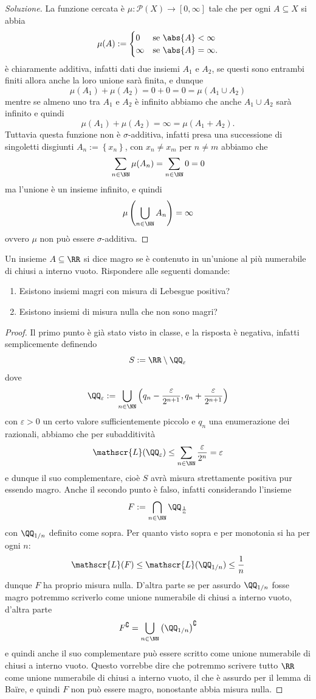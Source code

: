 \documentclass[11pt]{scrartcl}
\newcommand{\parti}[1]{\mathcal{P}\!\left(#1\right)}
\begin{document}
	\begin{proof}[Soluzione]
		La funzione cercata è $\mu:\parti{X}\to [0,\infty]$ tale che per ogni $A\subseteq X$ si abbia 
		$$
		\mu(A):=
		\begin{cases}
			0 & \text{se $\abs{A}<\infty$} \\
			\infty & \text{se $\abs{A}=\infty$.}
		\end{cases}
		$$
		è chiaramente additiva, infatti dati due insiemi $A_1$ e $A_2$, se questi sono entrambi finiti allora anche la loro unione sarà finita, e dunque
		$$\mu(A_1)+\mu(A_2)=0+0=0=\mu(A_1\cup A_2)$$
		mentre se almeno uno tra $A_1$ e $A_2$ è infinito abbiamo che anche $A_1\cup A_2$ sarà infinito e quindi
		$$\mu(A_1)+\mu(A_2)=\infty = \mu(A_1+A_2).$$
		Tuttavia questa funzione non è $\sigma$-additiva, infatti presa una successione di singoletti disgiunti $A_n:=\left\{x_n\right\}$, con $x_n\ne x_m$ per $n\ne m$ abbiamo che
		$$\sum_{n\in\NN}\mu(A_n)=\sum_{n\in\NN}0=0$$
		ma l'unione è un insieme infinito, e quindi
		$$\mu\left(\bigcup_{n\in\NN}A_n\right)=\infty$$
		ovvero $\mu$ non può essere $\sigma$-additiva.
	\end{proof}
	\begin{exercise}
		Un insieme $A\subseteq \RR$ si dice magro se è contenuto in un'unione al più numerabile di chiusi a interno vuoto. Rispondere alle seguenti domande:
		\begin{enumerate}
			\item Esistono insiemi magri con misura di Lebesgue positiva?
			\item Esistono insiemi di misura nulla che non sono magri?
		\end{enumerate}
	\end{exercise}
	\begin{proof}
		Il primo punto è già stato visto in classe, e la risposta è negativa, infatti semplicemente definendo
		$$S:=\RR\setminus\QQ_\varepsilon$$
		dove
		$$\QQ_\varepsilon:=\bigcup_{n\in\NN}\left(q_n-\frac{\varepsilon}{2^{n+1}},q_n+\frac{\varepsilon}{2^{n+1}}\right)$$
		con $\varepsilon>0$ un certo valore sufficientemente piccolo e $q_n$ una enumerazione dei razionali, abbiamo che per subadditività
		$$\mathscr{L}(\QQ_\varepsilon)\le \sum_{n\in\NN}\frac{\varepsilon}{2^n}=\varepsilon$$
		e dunque il suo complementare, cioè $S$ avrà misura strettamente positiva pur essendo magro. Anche il secondo punto è falso, infatti considerando l'insieme
		$$F:=\bigcap_{n\in\NN}\QQ_{\frac{1}{n}}$$
		con $\QQ_{1/n}$ definito come sopra. Per quanto visto sopra e per monotonia si ha per ogni $n$:
		$$\mathscr{L}(F)\le \mathscr{L}(\QQ_{1/n})\le \frac{1}{n}$$
		dunque $F$ ha proprio misura nulla. D'altra parte se per assurdo $\QQ_{1/n}$ fosse magro potremmo scriverlo come unione numerabile di chiusi a interno vuoto, d'altra parte
		$$F^\complement=\bigcup_{n\in\NN}\left(\QQ_{1/n}\right)^\complement$$
		e quindi anche il suo complementare può essere scritto come unione numerabile di chiusi a interno vuoto. Questo vorrebbe dire che potremmo scrivere tutto $\RR$ come unione numerabile di chiusi a interno vuoto, il che è assurdo per il lemma di Ba\"ire, e quindi $F$ non può essere magro, nonostante abbia misura nulla.
	\end{proof}
\end{document}
